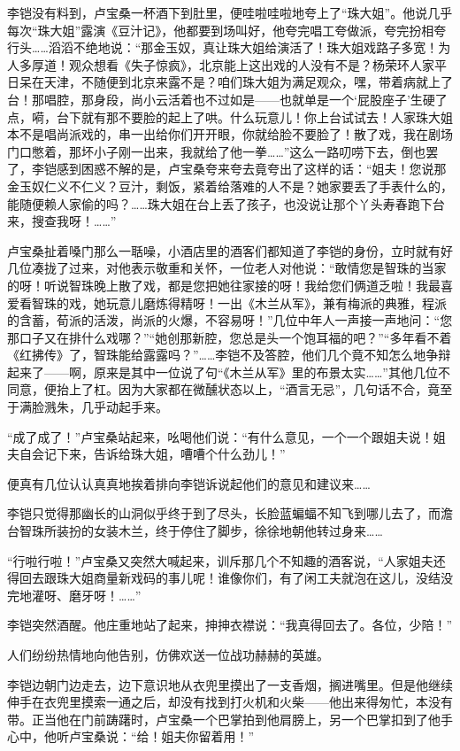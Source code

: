 \par 李铠没有料到，卢宝桑一杯酒下到肚里，便哇啦哇啦地夸上了“珠大姐”。他说几乎每次“珠大姐”露演《豆汁记》，他都要到场叫好，他夸完唱工夸做派，夸完扮相夸行头……滔滔不绝地说：“那金玉奴，真让珠大姐给演活了！珠大姐戏路子多宽！为人多厚道！观众想看《失子惊疯》，北京能上这出戏的人没有不是？杨荣环人家平日呆在天津，不随便到北京来露不是？咱们珠大姐为满足观众，嘿，带着病就上了台！那唱腔，那身段，尚小云活着也不过如是——也就单是一个‘屁股座子’生硬了点，嗬，台下就有那不要脸的起上了哄。什么玩意儿！你上台试试去！人家珠大姐本不是唱尚派戏的，串一出给你们开开眼，你就给脸不要脸了！散了戏，我在剧场门口憋着，那坏小子刚一出来，我就给了他一拳……”这么一路叨唠下去，倒也罢了，李铠感到困惑不解的是，卢宝桑夸来夸去竟夸出了这样的话：“姐夫！您说那金玉奴仁义不仁义？豆汁，剩饭，紧着给落难的人不是？她家要丢了手表什么的，能随便赖人家偷的吗？……珠大姐在台上丢了孩子，也没说让那个丫头寿春跑下台来，搜查我呀！……”
\par 卢宝桑扯着嗓门那么一聒噪，小酒店里的酒客们都知道了李铠的身份，立时就有好几位凑拢了过来，对他表示敬重和关怀，一位老人对他说：“敢情您是智珠的当家的呀！听说智珠晚上散了戏，都是您把她往家接的呀！我给您们俩道乏啦！我最喜爱看智珠的戏，她玩意儿磨炼得精呀！一出《木兰从军》，兼有梅派的典雅，程派的含蓄，荀派的活泼，尚派的火爆，不容易呀！”几位中年人一声接一声地问：“您那口子又在排什么戏哪？”“她创那新腔，您总是头一个饱耳福的吧？”“多年看不着《红拂传》了，智珠能给露露吗？”……李铠不及答腔，他们几个竟不知怎么地争辩起来了——啊，原来是其中一位说了句“《木兰从军》里的布景太实……”其他几位不同意，便抬上了杠。因为大家都在微醺状态以上，“酒言无忌”，几句话不合，竟至于满脸溅朱，几乎动起手来。
\par “成了成了！”卢宝桑站起来，吆喝他们说：“有什么意见，一个一个跟姐夫说！姐夫自会记下来，告诉给珠大姐，嘈嘈个什么劲儿！”
\par 便真有几位认认真真地挨着排向李铠诉说起他们的意见和建议来……
\par 李铠只觉得那幽长的山洞似乎终于到了尽头，长脸蓝蝙蝠不知飞到哪儿去了，而澹台智珠所装扮的女装木兰，终于停住了脚步，徐徐地朝他转过身来……
\par “行啦行啦！”卢宝桑又突然大喊起来，训斥那几个不知趣的酒客说，“人家姐夫还得回去跟珠大姐商量新戏码的事儿呢！谁像你们，有了闲工夫就泡在这儿，没结没完地灌呀、磨牙呀！……”
\par 李铠突然酒醒。他庄重地站了起来，抻抻衣襟说：“我真得回去了。各位，少陪！”
\par 人们纷纷热情地向他告别，仿佛欢送一位战功赫赫的英雄。
\par 李铠边朝门边走去，边下意识地从衣兜里摸出了一支香烟，搁进嘴里。但是他继续伸手在衣兜里摸索一通之后，却没有找到打火机和火柴——他出来得匆忙，本没有带。正当他在门前踌躇时，卢宝桑一个巴掌拍到他肩膀上，另一个巴掌扣到了他手心中，他听卢宝桑说：“给！姐夫你留着用！”
